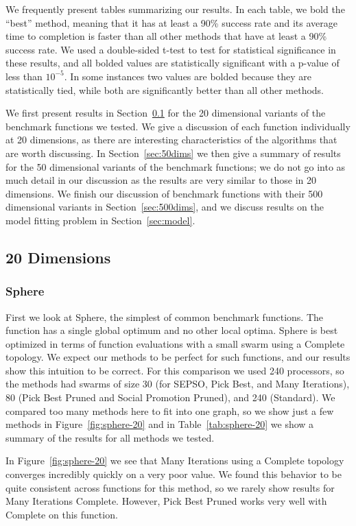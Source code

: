 \documentclass[smallcondensed]{svjour3}
\renewcommand{\sec}[1]{Section~\ref{sec:#1}}
\newcommand{\fig}[1]{Figure~\ref{fig:#1}}
\newcommand{\tabref}[1]{Table~\ref{tab:#1}}
\begin{document}
We frequently present tables summarizing our results.  In each table, we bold
the ``best'' method, meaning that it has at least a 90\% success rate and its
average time to completion is faster than all other methods that have at least
a 90\% success rate.  We used a double-sided t-test to test for statistical
significance in these results, and all bolded values are statistically
significant with a p-value of less than $10^{-5}$.  In some instances two
values are bolded because they are statistically tied, while both are
significantly better than all other methods.

We first present results in \sec{20dims} for the 20 dimensional variants of the
benchmark functions we tested.  We give a discussion of each function
individually at 20 dimensions, as there are interesting characteristics of the
algorithms that are worth discussing.  In \sec{50dims} we then give a summary
of results for the 50 dimensional variants of the benchmark functions; we do
not go into as much detail in our discussion as the results are very similar to
those in 20 dimensions.  We finish our discussion of benchmark functions with
their 500 dimensional variants in \sec{500dims}, and we discuss results on the
model fitting problem in \sec{model}.

\subsection{20 Dimensions}
\label{sec:20dims}

\subsubsection{Sphere}
\label{sec:sphere20dims}

First we look at Sphere, the simplest of common benchmark functions.  The
function has a single global optimum and no other local optima.  Sphere is best
optimized in terms of function evaluations with a small swarm using a Complete
topology.  We expect our methods to be perfect for such functions, and our
results show this intuition to be correct.  For this comparison we used 240
processors, so the methods had swarms of size 30 (for SEPSO, Pick Best, and
Many Iterations), 80 (Pick Best Pruned and Social Promotion Pruned), and 240
(Standard).  We compared too many methods here to fit into one graph, so we
show just a few methods in \fig{sphere-20} and in \tabref{sphere-20} we show a
summary of the results for all methods we tested.

In \fig{sphere-20} we see that Many Iterations using a Complete topology
converges incredibly quickly on a very poor value.  We found this behavior to
be quite consistent across functions for this method, so we rarely show results
for Many Iterations Complete.  However, Pick Best Pruned works very well with
Complete on this function.
\end{document}
